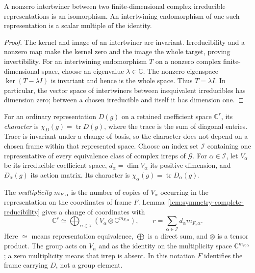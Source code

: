 \begin{lemma}
\label{lem:symmetry-schur}
A nonzero intertwiner between two finite-dimensional complex irreducible
representations is an isomorphism. An intertwining endomorphism of one such
representation is a scalar multiple of the identity.
\end{lemma}
\begin{proof}
The kernel and image of an intertwiner are invariant. Irreducibility and a
nonzero map make the kernel zero and the image the whole target, proving
invertibility. For an intertwining endomorphism $T$ on a nonzero complex
finite-dimensional space, choose an eigenvalue $\lambda\in\mathbb C$.
The nonzero eigenspace $\ker(T-\lambda I)$ is invariant and hence is the
whole space. Thus $T=\lambda I$. In particular, the vector space of
intertwiners between inequivalent irreducibles has dimension zero; between
a chosen irreducible and itself it has dimension one.
\end{proof}

\begin{definition}
\label{def:symmetry-character-multiplicity}
For an ordinary representation $D(g)$ on a retained coefficient space
$\mathbb C^r$, its \emph{character} is $\chi_D(g)=\operatorname{tr}D(g)$,
where the trace is the sum of diagonal entries. Trace is invariant under a
change of basis, so the character does not depend on a chosen frame within
that represented space. Choose an index set $\mathcal I$ containing one
representative of every equivalence class of complex irreps of $\mathcal G$.
For $\alpha\in\mathcal I$, let $V_\alpha$ be its irreducible coefficient
space, $d_\alpha=\dim V_\alpha$ its positive dimension, and
$D_\alpha(g)$ its action matrix. Its character is
$\chi_\alpha(g)=\operatorname{tr}D_\alpha(g)$.

The \emph{multiplicity} $m_{F,\alpha}$ is the number of copies of
$V_\alpha$ occurring in the representation on the coordinates of frame $F$.
Lemma~\ref{lem:symmetry-complete-reducibility} gives a change of coordinates
with
\begin{equation}
  \mathbb C^r\simeq\bigoplus_{\alpha\in\mathcal I}
     \left(V_\alpha\otimes\mathbb C^{m_{F,\alpha}}\right),
  \qquad r=\sum_{\alpha\in\mathcal I}d_\alpha m_{F,\alpha}.
  \label{eq:symmetry-isotypic-decomposition}
\end{equation}
Here $\simeq$ means representation equivalence, $\bigoplus$ is a direct sum,
and $\otimes$ is a tensor product. The group acts on $V_\alpha$ and as the
identity on the multiplicity space $\mathbb C^{m_{F,\alpha}}$; a zero
multiplicity means that irrep is absent. In this notation $F$ identifies the
frame carrying $D$, not a group element.
\end{definition}

